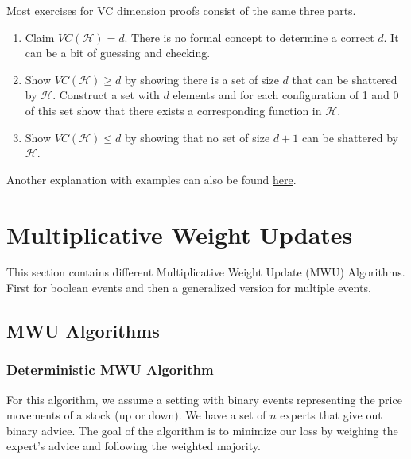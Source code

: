 \documentclass[english]{panikzettel}
\begin{document}
Most exercises for VC dimension proofs consist of the same three parts.
\begin{enumerate}
    \item Claim $VC(\mathcal{H})=d$. There is no formal concept to determine a correct $d$. It can be a bit of guessing and checking.
    \item Show $VC(\mathcal{H})\geq d$ by showing there is a set of size $d$ that can be shattered by $\mathcal{H}$. Construct a set with $d$ elements and for each configuration of 1 and 0 of this set show that there exists a corresponding function in $\mathcal{H}$.
    \item Show $VC(\mathcal{H})\leq d$ by showing that no set of size $d+1$ can be shattered by $\mathcal{H}$.
\end{enumerate}

Another explanation with examples can also be found \href{https://towardsdatascience.com/measuring-the-power-of-a-classifier-c765a7446c1c}{here}.


\section{Multiplicative Weight Updates}
This section contains different Multiplicative Weight Update (MWU) Algorithms. First for boolean events and then a generalized version for multiple events.

\subsection{MWU Algorithms}
\subsubsection{Deterministic MWU Algorithm}
For this algorithm, we assume a setting with binary events representing the price movements of a stock (up or down). We have a set of $n$ experts that give out binary advice. The goal of the algorithm is to minimize our loss by weighing the expert's advice and following the weighted majority.
\end{document}
